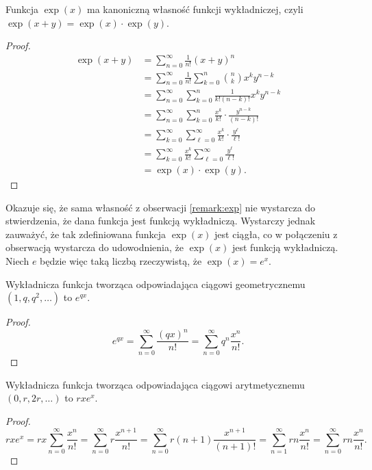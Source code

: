 \documentclass[shortabstract]{imthesis}
\begin{document}
\begin{remark} \label{remark:exp}
    Funkcja $\exp(x)$ ma kanoniczną własność funkcji wykładniczej, czyli $\exp(x+y) = \exp(x) \cdot \exp(y)$.
\end{remark}
\begin{proof}
    \begin{align*}
    \exp(x+y) &= \sum_{n=0}^\infty \frac{1}{n!} (x+y)^n \\
    &= \sum_{n=0}^\infty \frac{1}{n!} \sum_{k=0}^n {n \choose k} x^k y^{n-k} \\
    &= \sum_{n=0}^\infty \sum_{k=0}^n \frac{1}{k!(n-k)!} x^k y^{n-k} \\
    &= \sum_{n=0}^\infty \sum_{k=0}^n \frac{x^k}{k!} \cdot \frac{y^{n-k}}{(n-k)!} \\
    &= \sum_{k=0}^\infty \sum_{\ell=0}^\infty \frac{x^k}{k!} \cdot \frac{y^\ell}{\ell!} \\
    &= \sum_{k=0}^\infty \frac{x^k}{k!} \sum_{\ell=0}^\infty \frac{y^\ell}{\ell!} \\
    &= \exp(x) \cdot \exp(y).
    \end{align*}
\end{proof}

Okazuje się, że sama własność z obserwacji \ref{remark:exp} nie wystarcza do stwierdzenia, że dana funkcja jest funkcją wykładniczą. Wystarczy jednak zauważyć, że tak zdefiniowana funkcja $\exp(x)$ jest ciągła, co w połączeniu z obserwacją wystarcza do udowodnienia, że $\exp(x)$ jest funkcją wykładniczą. Niech $e$ będzie więc taką liczbą rzeczywistą, że $\exp(x) = e^x$.

\begin{remark}
    Wykładnicza funkcja tworząca odpowiadająca ciągowi geometrycznemu $(1, q, q^2, \ldots)$ to $e^{qx}$.
\end{remark}
\begin{proof}
    $$
    e^{qx} = \sum_{n=0}^\infty \frac{(qx)^n}{n!} = \sum_{n=0}^\infty q^n \frac{x^n}{n!}.
    $$
\end{proof}

\begin{remark}
    Wykładnicza funkcja tworząca odpowiadająca ciągowi arytmetycznemu $(0, r, 2r, \ldots)$ to $rxe^x$.
\end{remark}
\begin{proof}
    $$
        rxe^x = rx\sum_{n=0}^\infty \frac{x^n}{n!} = \sum_{n=0}^\infty r\frac{x^{n+1}}{n!} = \sum_{n=0}^\infty r(n+1)\frac{x^{n+1}}{(n+1)!} = \sum_{n=1}^\infty rn\frac{x^n}{n!} = \sum_{n=0}^\infty rn\frac{x^n}{n!}.
    $$
\end{proof}
\end{document}
